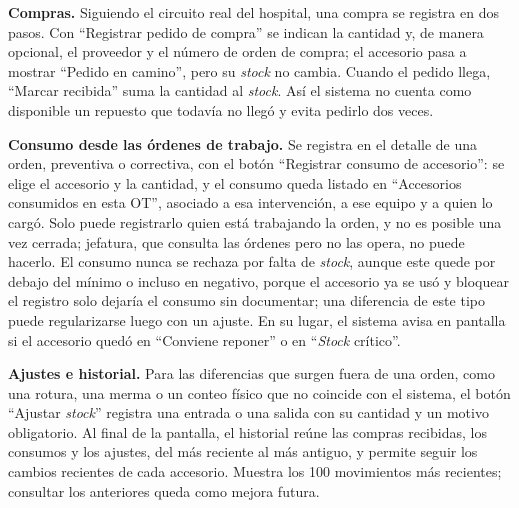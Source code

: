 \documentclass[10pt]{article}
\begin{document}
\textbf{Compras.} Siguiendo el circuito real del hospital, una compra se registra en dos pasos. Con “Registrar pedido de compra” se indican la cantidad y, de manera opcional, el proveedor y el número de orden de compra; el accesorio pasa a mostrar “Pedido en camino”, pero su \textit{stock} no cambia. Cuando el pedido llega, “Marcar recibida” suma la cantidad al \textit{stock}. Así el sistema no cuenta como disponible un repuesto que todavía no llegó y evita pedirlo dos veces.

\textbf{Consumo desde las órdenes de trabajo.} Se registra en el detalle de una orden, preventiva o correctiva, con el botón “Registrar consumo de accesorio”: se elige el accesorio y la cantidad, y el consumo queda listado en “Accesorios consumidos en esta OT”, asociado a esa intervención, a ese equipo y a quien lo cargó. Solo puede registrarlo quien está trabajando la orden, y no es posible una vez cerrada; jefatura, que consulta las órdenes pero no las opera, no puede hacerlo. El consumo nunca se rechaza por falta de \textit{stock}, aunque este quede por debajo del mínimo o incluso en negativo, porque el accesorio ya se usó y bloquear el registro solo dejaría el consumo sin documentar; una diferencia de este tipo puede regularizarse luego con un ajuste. En su lugar, el sistema avisa en pantalla si el accesorio quedó en “Conviene reponer” o en “\textit{Stock} crítico”. 

\textbf{Ajustes e historial.} Para las diferencias que surgen fuera de una orden, como una rotura, una merma o un conteo físico que no coincide con el sistema, el botón “Ajustar \textit{stock}” registra una entrada o una salida con su cantidad y un motivo obligatorio. Al final de la pantalla, el historial reúne las compras recibidas, los consumos y los ajustes, del más reciente al más antiguo, y permite seguir los cambios recientes de cada accesorio. Muestra los 100 movimientos más recientes; consultar los anteriores queda como mejora futura.
\end{document}
